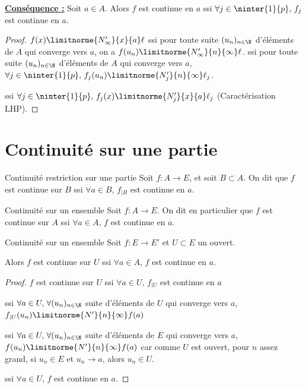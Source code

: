 \textbf{\uline{Conséquence :}}
Soit $a \in A$. Alors $f$ est continue en $a$ ssi $\forall j \in \ninter{1}{p}, \, f_j$ est continue en $a$.


\begin{proof}
    $f(x) \limitnorme{N'_\infty}{x}{a} \ell$ ssi pour toute suite $(u_n)_{n \in \N}$ 
    d'éléments de $A$ qui converge vers $a$, on a $f(u_n) \limitnorme{N'_\infty}{n}{\infty} \ell$.
    ssi pour toute suite $(u_n)_{n \in \N}$ d'éléments de $A$ qui converge vers $a$, 
    $\forall j \in \ninter{1}{p}, \, f_j(u_n) \limitnorme{N'_j}{n}{\infty} \ell_j$.


    ssi $\forall j \in \ninter{1}{p}, \, f_j(x) \limitnorme{N'_j}{x}{a} \ell_j$ (Caractérisation LHP).
\end{proof}



\section{Continuité sur une partie}

\begin{definition}{Continuité restriction sur une partie}{}
    Soit $f: A \to E$, et soit $B \subset A$. On dit que $f$ est continue sur $B$ ssi 
    $\forall a \in B, \, f_{|B}$ est continue en $a$.
\end{definition}


\begin{definition}{Continuité sur un ensemble}{}
    Soit $f : A \to E$. On dit en particulier que $f$ est continue sur $A$ ssi
    $\forall a \in A, \, f$ est continue en $a$.
\end{definition}


\begin{proposition}{Continuité sur un ensemble}{}
    Soit $f : E \to E'$ et $U \subset E$ un ouvert.

    Alors $f$ est continue sur $U$ ssi $\forall a \in A$, $f$ est continue en $a$. 
\end{proposition}

\begin{proof}
    $f$ est continue sur $U$ ssi $\forall a \in U, \, f_{|U}$ est continue en $a$ 
    
    ssi $\forall a \in U, \, \forall (u_n)_{n \in \N}$ suite d'éléments de $U$ qui converge vers $a$,
    $f_{|U}(u_n) \limitnorme{N'}{n}{\infty} f(a)$

    ssi $\forall a \in U, \, \forall (u_n)_{n \in \N}$ suite d'éléments de $E$ qui converge vers $a$,
    $f(u_n) \limitnorme{N'}{n}{\infty} f(a)$ car comme $U$ est ouvert, pour $n$ assez
    grand, si $u_n \in E$ et $u_n \to a$, alors $u_n \in U$.

    ssi $\forall a \in U, \, f$ est continue en $a$.
\end{proof}

